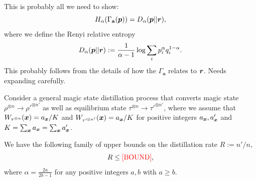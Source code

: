 \documentclass[pra,
aps,
twocolumn,
superscriptaddress,
groupedaddress,
nofootinbib,
reprint
]{revtex4-1}
\begin{document}
This is probably all we need to show:
\begin{equation}
H_\alpha(\Gamma_{\mathbf{a}}(\boldsymbol{p})) = D_\alpha(\boldsymbol{p} ||\boldsymbol{r}),
\end{equation}
where we define the Renyi relative entropy
\begin{equation}
D_\alpha (\boldsymbol{p} || \boldsymbol{r}) := \frac{1}{\alpha -1} \log \sum_i p_i^\alpha q_i^{1-\alpha}.
\end{equation}
This probably follows from the details of how the $\Gamma_{\mathbf{a}}$ relates to $\boldsymbol{r}$. Needs expanding carefully.

\begin{theorem}
	Consider a general magic state distillation process that converts magic state $\rho^{\otimes n} \longrightarrow \rho'^{\otimes n'}$ as well as equilibrium state $\tau^{\otimes n} \longrightarrow \tau'^{\otimes n'}$, where we assume that $W_{\tau^{\otimes n}}(\bm{x}) = a_{\bm{x}}/K$ and $W_{\tau'^{\otimes n'}}(\bm{x}) = a_{\bm{x}}/K$ for positive integers $a_{\bm{x}}, a_{\bm{x}}'$ and $K = \sum_{\bm{x}} a_{\bm{x}} = \sum_{\bm{x}} a_{\bm{x}}'$.  
	
	We have the following family of upper bounds on the distillation rate $R := n'/n$,
	\begin{equation}
		R \leq \text{{\color{red}[BOUND]}},
	\end{equation}
	where $\alpha = \frac{2a}{2b-1}$ for any positive integers $a,b$ with $a \geq b$.
\end{theorem}
\end{document}

